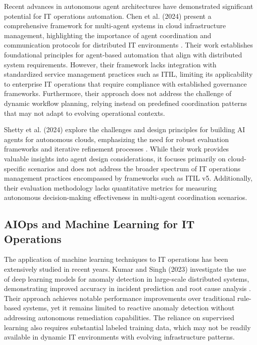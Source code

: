 \documentclass{article}
\begin{document}
Recent advances in autonomous agent architectures have demonstrated significant potential for IT operations automation. Chen et al. (2024) present a comprehensive framework for multi-agent systems in cloud infrastructure management, highlighting the importance of agent coordination and communication protocols for distributed IT environments \cite{chen2024}. Their work establishes foundational principles for agent-based automation that align with distributed system requirements. However, their framework lacks integration with standardized service management practices such as ITIL, limiting its applicability to enterprise IT operations that require compliance with established governance frameworks. Furthermore, their approach does not address the challenge of dynamic workflow planning, relying instead on predefined coordination patterns that may not adapt to evolving operational contexts.

Shetty et al. (2024) explore the challenges and design principles for building AI agents for autonomous clouds, emphasizing the need for robust evaluation frameworks and iterative refinement processes \cite{shetty2024}. While their work provides valuable insights into agent design considerations, it focuses primarily on cloud-specific scenarios and does not address the broader spectrum of IT operations management practices encompassed by frameworks such as ITIL v5. Additionally, their evaluation methodology lacks quantitative metrics for measuring autonomous decision-making effectiveness in multi-agent coordination scenarios.

\subsection{AIOps and Machine Learning for IT Operations}

The application of machine learning techniques to IT operations has been extensively studied in recent years. Kumar and Singh (2023) investigate the use of deep learning models for anomaly detection in large-scale distributed systems, demonstrating improved accuracy in incident prediction and root cause analysis \cite{kumar2023}. Their approach achieves notable performance improvements over traditional rule-based systems, yet it remains limited to reactive anomaly detection without addressing autonomous remediation capabilities. The reliance on supervised learning also requires substantial labeled training data, which may not be readily available in dynamic IT environments with evolving infrastructure patterns.
\end{document}
